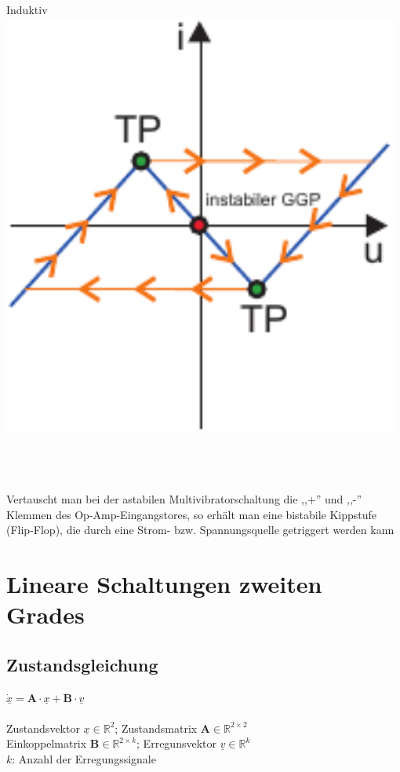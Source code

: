\documentclass[a4paper,twocolumn,10pt]{article}
\begin{document}
\begin{minipage}[t]{0.23\textwidth}
Induktiv\\
\includegraphics[width=0.98\textwidth]{img/PfadSprung2}\\\\
\end{minipage}\\\\
Vertauscht man bei der astabilen Multivibratorschaltung die ,,+'' und ,,-'' Klemmen des Op-Amp-Eingangstores, so erhält man eine bistabile Kippstufe (Flip-Flop), die durch eine Strom- bzw. Spannungsquelle getriggert werden kann

\section*{Lineare Schaltungen zweiten Grades}
\subsection*{Zustandsgleichung}
$\underline{\dot x}=\textbf{A}\cdot \underline{x}+\textbf{B}\cdot \underline{v}$\\\\
Zustandsvektor $\underline{x}\in \mathbb{R}^{2}$; Zustandsmatrix $\textbf{A}\in \mathbb{R}^{2\times 2}$\\
Einkoppelmatrix $\textbf{B}\in \mathbb{R}^{2\times k}$; Erregunsvektor $\underline{v}\in \mathbb{R}^{k}$\\
$k$: Anzahl der Erregungssignale
\end{document}
